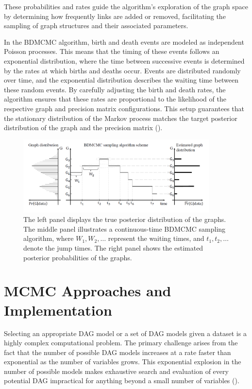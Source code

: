 \documentclass{report}
\begin{document}
These probabilities and rates guide the algorithm's exploration of the graph space by determining how frequently links are added or removed, facilitating the sampling of graph structures and their associated parameters. 

In the BDMCMC algorithm,  birth and death events are modeled as independent Poisson processes. This means that the timing of these events follows an exponential distribution, where the time between successive events is determined by the rates at which births and deaths occur. Events are distributed randomly over time, and the exponential distribution describes the waiting time between these random events. By carefully adjusting the birth and death rates, the algorithm ensures that these rates are proportional to the likelihood of the respective graph and precision matrix configurations. This setup guarantees that the stationary distribution of the Markov process matches the target posterior distribution of the graph and the precision matrix  (\citet{mohammadi2015bayesian}).

\begin{figure}[h] 
	\centering
	\includegraphics[width=0.9\textwidth]{Figures/State_of_art/BDMCMC_theory.png}
	\caption{The left panel displays the true posterior distribution of the graphs. The middle panel illustrates a continuous-time BDMCMC sampling algorithm, where ${W_1, W_2, \dots}$ represent the waiting times, and ${t_1, t_2, \dots}$ denote the jump times. The right panel shows the estimated posterior probabilities of the graphs.}
	\label{fig:BDMCMC}
\end{figure}

\chapter{MCMC Approaches and Implementation}

Selecting an appropriate DAG model or a set of DAG models given a dataset is a highly complex computational problem. The primary challenge arises from the fact that the number of possible DAG models increases at a rate faster than exponential as the number of variables grows. This exponential explosion in the number of possible models makes exhaustive search and evaluation of every potential DAG impractical for anything beyond a small number of variables (\citet{geiger2002parameter}).
\end{document}
